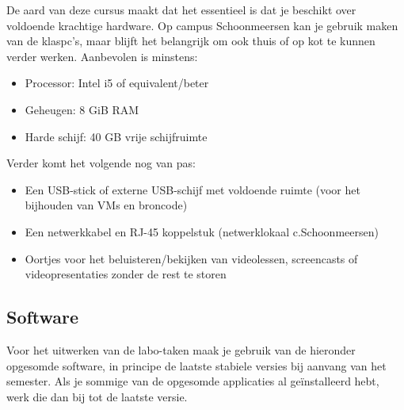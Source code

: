 De aard van deze cursus maakt dat het essentieel is dat je beschikt over voldoende krachtige hardware. Op campus Schoonmeersen kan je gebruik maken van de klaspc's, maar blijft het belangrijk om ook thuis of op kot te kunnen verder werken. Aanbevolen is minstens:

\begin{itemize}
  \item Processor: Intel i5 of equivalent/beter
  \item Geheugen: 8 GiB RAM
  \item Harde schijf: 40 GB vrije schijfruimte
\end{itemize}

Verder komt het volgende nog van pas:

\begin{itemize}
  \item Een USB-stick of externe USB-schijf met voldoende ruimte (voor het bijhouden van VMs en broncode)
  \item Een netwerkkabel en RJ-45 koppelstuk (netwerklokaal c.Schoonmeersen)
  \item Oortjes voor het beluisteren/bekijken van videolessen, screencasts of videopresentaties zonder de rest te storen
\end{itemize}

\subsection{Software}
\label{ssec:software}

Voor het uitwerken van de labo-taken maak je gebruik van de hieronder opgesomde software, in principe de laatste stabiele versies bij aanvang van het semester. Als je sommige van de opgesomde applicaties al geïnstalleerd hebt, werk die dan bij tot de laatste versie.


